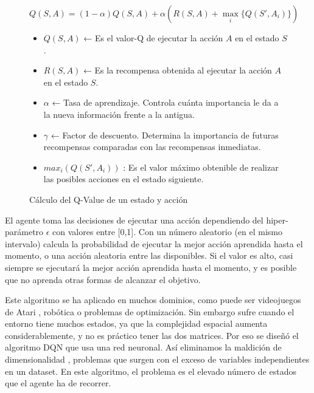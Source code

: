 		
		\begin{figure}[!h]				
		\begin{flushleft}
		\begin{mdframed}[roundcorner=5pt]
			\[
			Q(S,A) = (1 - \alpha) Q(S,A) + \alpha \left( R(S,A) + \max_{i} \{ Q(S',A_i) \} \right)
			\]
			\begin{itemize}
				\item \( Q(S,A) \) ← Es el valor-Q de ejecutar la acción \( A \) en el estado \( S \).
				\item \( R(S,A) \) ← Es la recompensa obtenida al ejecutar la acción \( A \) en el estado \( S \).
				\item \( \alpha \) ← Tasa de aprendizaje. Controla cuánta importancia le da a la nueva información frente a la antigua.
				\item \( \gamma \) ← Factor de descuento. Determina la importancia de futuras recompensas comparadas con las recompensas inmediatas.
				\item \( max_{i}(Q(S',A_i)) \) : Es el valor máximo obtenible de realizar las posibles acciones en el estado siguiente.
			\end{itemize}
		\end{mdframed}		
		\end{flushleft}
		\caption{Cálculo del Q-Value de un estado y acción}	
		\label{fig:qvalue}
		\end{figure}
		
		
		El agente toma las decisiones de ejecutar una acción dependiendo del hiper-parámetro $\epsilon$  con valores entre [0,1]. Con un número aleatorio (en el mismo intervalo) calcula la probabilidad de ejecutar la mejor acción aprendida hasta el momento, o una acción aleatoria entre las disponibles. Si el valor es alto, casi siempre se ejecutará la mejor acción aprendida hasta el momento, y es posible que no aprenda otras formas de alcanzar el objetivo.
		
		
		Este algoritmo se ha aplicado en muchos dominios, como puede ser videojuegos de Atari \cite{mnih2013playing}, robótica o problemas de optimización. Sin embargo sufre cuando el entorno tiene muchos estados, ya que la complejidad espacial aumenta considerablemente, y no es práctico tener las dos matrices. Por eso se diseñó el algoritmo DQN que usa una red neuronal. Así eliminamos la maldición de dimensionalidad \cite{kuo2005lifting}, problemas que surgen con el exceso de variables independientes en un dataset. En este algoritmo, el problema es el elevado número de estados que el agente ha de recorrer.\\
		
